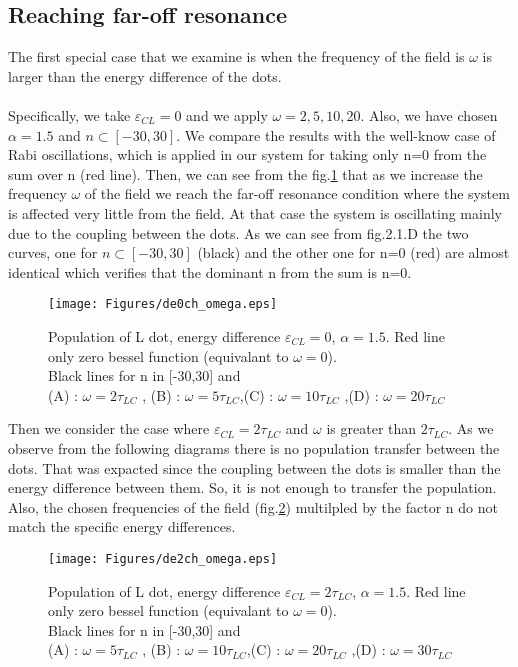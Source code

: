 \subsection{Reaching far-off resonance}

The first special case that we examine is when the frequency of the field is $\omega$ is larger than the energy difference of the dots. \\
\\
Specifically, we take $\varepsilon_{CL}=0$ and we apply $\omega=2,5,10,20$. Also, we have chosen $\alpha=1.5$ and $n \subset \left[ -30,30\right]$. We compare the results with the well-know case of Rabi oscillations, which is applied in our system for taking only n=0 from the sum over n (red line). 
Then,  we can see  from the fig.\ref{fig:2.1} that as we increase the frequency $\omega$ of the field we reach the far-off resonance condition where the system is affected very little from the field. At that case the system is oscillating mainly due to the coupling between the dots. As we can see from fig.2.1.D the two curves, one for $n \subset \left[ -30,30\right]$ (black) and the other one for n=0 (red)  are almost identical which verifies that the dominant n from the sum is n=0.


\begin{figure}
\centering
\texttt{[image: Figures/de0ch\_omega.eps]}
\decoRule
\caption[Far-off resonance]{Population of L dot, energy difference $\varepsilon_{CL}=0$, $\alpha=1.5$. Red line only zero bessel function (equivalant to $\omega=0$). \\Black lines for n in [-30,30] and \\ (A) : $\omega=2\tau_{LC}$ , (B) : $\omega=5\tau_{LC}$,(C) : $\omega=10\tau_{LC}$ ,(D) : $\omega=20\tau_{LC}$}
\label{fig:2.1}
\end{figure}

Then we consider the case where $\varepsilon_{CL}=2\tau_{LC}$ and $\omega$ is greater than $2\tau_{LC}$. As we observe from the following diagrams there is no population transfer between the dots. That was expacted since the coupling between the dots is smaller than the energy difference between them. So, it is not enough to transfer the population. Also, the chosen frequencies of the field (fig.\ref{fig:2.2}) multilpled by the factor n do not match the specific energy differences.


\begin{figure}
\centering
\texttt{[image: Figures/de2ch\_omega.eps]}
\decoRule
\caption[Far-off resonance]{Population of L dot, energy difference $\varepsilon_{CL}=2\tau_{LC}$, $\alpha=1.5$. Red line only zero bessel function (equivalant to $\omega=0$). \\Black lines for n in [-30,30] and \\ (A) : $\omega=5\tau_{LC}$ , (B) : $\omega=10\tau_{LC}$,(C) : $\omega=20\tau_{LC}$ ,(D) : $\omega=30\tau_{LC}$}
\label{fig:2.2}
\end{figure}

